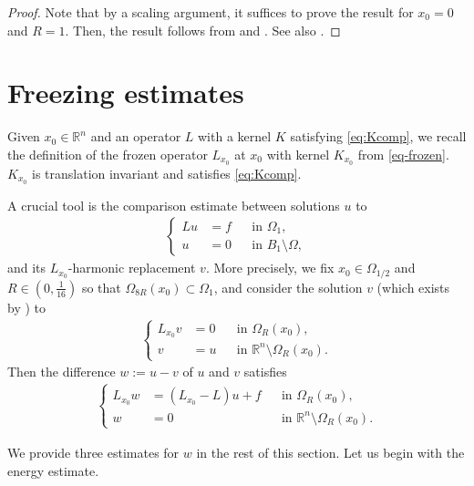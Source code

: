 \documentclass[11pt,reqno]{amsart}
\theoremstyle{plain}
\theoremstyle{definition}
\numberwithin{equation}{section}
\newcommand{\R}{\mathbb{R}}
\newcommand{\1}{\mathbbm{1}}
\begin{document}
\begin{proof}
    Note that by a scaling argument, it suffices to prove the result for $x_0 = 0$ and $R = 1$. Then, the result follows from \cite{KNS22} and \cite{Now23}. See also \cite{FeRo24b}.
\end{proof}



\section{Freezing estimates}
\label{sec:freezing}



Given $x_0 \in \R^n$ and an operator $L$ with a kernel $K$ satisfying \eqref{eq:Kcomp}, we recall the definition of the frozen operator $L_{x_0}$ at  $x_0$ with kernel $K_{x_0}$ from \eqref{eq-frozen}. $K_{x_0}$ is translation invariant and satisfies \eqref{eq:Kcomp}.

A crucial tool is the comparison estimate between solutions $u$ to
\begin{align}\label{eq-u-Sect4}
\left\{
\begin{aligned}
Lu&=f &&\text{in }\Omega_1, \\
u&=0 &&\text{in } B_1 \setminus \Omega,
\end{aligned}
\right.
\end{align}
and its $L_{x_0}$-harmonic replacement $v$. More precisely, we fix $x_0 \in \Omega_{1/2}$ and $R \in (0, \frac{1}{16})$ so that $\Omega_{8R}(x_0) \subset \Omega_1$, and consider the solution $v$ (which exists by \cite[Theorem~4.3]{KiLe23}) to
\begin{align}\label{eq-v-Sect4}
\left\{
\begin{aligned}
L_{x_0}v&=0 &&\text{in }\Omega_R(x_0), \\
v&=u &&\text{in } \R^n \setminus \Omega_R(x_0).
\end{aligned}
\right.
\end{align}
Then the difference $w:=u-v$ of $u$ and $v$ satisfies
\begin{align}\label{eq-w-Sect4}
\left\{
\begin{aligned}
L_{x_0}w&=(L_{x_0}-L)u+f &&\text{in } \Omega_R(x_0), \\
w&=0 &&\text{in } \R^n \setminus \Omega_R(x_0).
\end{aligned}
\right.
\end{align}

We provide three estimates for $w$ in the rest of this section. Let us begin with the energy estimate.
\end{document}
